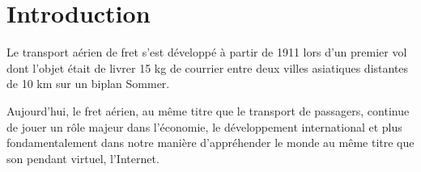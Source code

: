 
\pagebreak

\section*{Introduction}

Le transport aérien de fret s'est développé à partir de 1911 lors d'un
premier vol dont l'objet était de livrer 15 kg de courrier entre deux villes asiatiques distantes de 10 km sur un biplan Sommer. 


Aujourd'hui, le fret aérien, au même titre que le transport de passagers, continue de jouer un rôle majeur dans l'économie, le développement international et plus fondamentalement dans notre manière d'appréhender le monde au même titre que son pendant virtuel, l'Internet. 


%
%
%
%   



